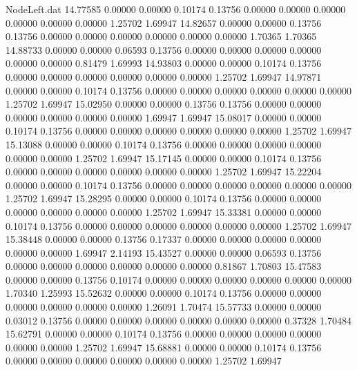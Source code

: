\begin{filecontents}{NodeLeft.dat}
  14.77585    0.00000    0.00000     0.10174    0.13756    0.00000    0.00000    0.00000    0.00000    0.00000    0.00000    1.25702    1.69947
  14.82657    0.00000    0.00000     0.13756    0.13756    0.00000    0.00000    0.00000    0.00000    0.00000    0.00000    1.70365    1.70365
  14.88733    0.00000    0.00000     0.06593    0.13756    0.00000    0.00000    0.00000    0.00000    0.00000    0.00000    0.81479    1.69993
  14.93803    0.00000    0.00000     0.10174    0.13756    0.00000    0.00000    0.00000    0.00000    0.00000    0.00000    1.25702    1.69947
  14.97871    0.00000    0.00000     0.10174    0.13756    0.00000    0.00000    0.00000    0.00000    0.00000    0.00000    1.25702    1.69947
  15.02950    0.00000    0.00000     0.13756    0.13756    0.00000    0.00000    0.00000    0.00000    0.00000    0.00000    1.69947    1.69947
  15.08017    0.00000    0.00000     0.10174    0.13756    0.00000    0.00000    0.00000    0.00000    0.00000    0.00000    1.25702    1.69947
  15.13088    0.00000    0.00000     0.10174    0.13756    0.00000    0.00000    0.00000    0.00000    0.00000    0.00000    1.25702    1.69947
  15.17145    0.00000    0.00000     0.10174    0.13756    0.00000    0.00000    0.00000    0.00000    0.00000    0.00000    1.25702    1.69947
  15.22204    0.00000    0.00000     0.10174    0.13756    0.00000    0.00000    0.00000    0.00000    0.00000    0.00000    1.25702    1.69947
  15.28295    0.00000    0.00000     0.10174    0.13756    0.00000    0.00000    0.00000    0.00000    0.00000    0.00000    1.25702    1.69947
  15.33381    0.00000    0.00000     0.10174    0.13756    0.00000    0.00000    0.00000    0.00000    0.00000    0.00000    1.25702    1.69947
  15.38448    0.00000    0.00000     0.13756    0.17337    0.00000    0.00000    0.00000    0.00000    0.00000    0.00000    1.69947    2.14193
  15.43527    0.00000    0.00000     0.06593    0.13756    0.00000    0.00000    0.00000    0.00000    0.00000    0.00000    0.81867    1.70803
  15.47583    0.00000    0.00000     0.13756    0.10174    0.00000    0.00000    0.00000    0.00000    0.00000    0.00000    1.70340    1.25993
  15.52632    0.00000    0.00000     0.10174    0.13756    0.00000    0.00000    0.00000    0.00000    0.00000    0.00000    1.26091    1.70474
  15.57733    0.00000    0.00000     0.03012    0.13756    0.00000    0.00000    0.00000    0.00000    0.00000    0.00000    0.37328    1.70484
  15.62791    0.00000    0.00000     0.10174    0.13756    0.00000    0.00000    0.00000    0.00000    0.00000    0.00000    1.25702    1.69947
  15.68881    0.00000    0.00000     0.10174    0.13756    0.00000    0.00000    0.00000    0.00000    0.00000    0.00000    1.25702    1.69947

\end{filecontents}
